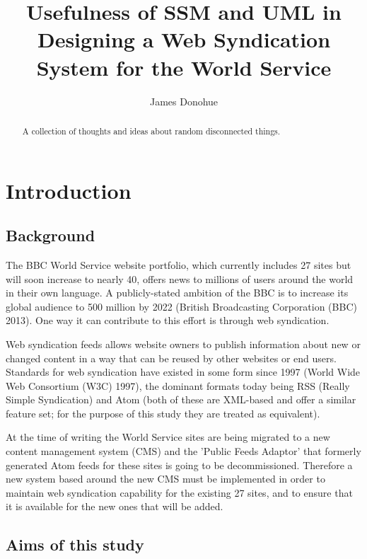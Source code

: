 \documentclass{article}
\begin{document}
\title{Usefulness of SSM and UML in Designing a Web Syndication System for the World Service}
\author{James Donohue}

\maketitle

\begin{abstract}
A collection of thoughts and ideas about random disconnected things.
\end{abstract}

\section{Introduction}
\subsection{Background}

The BBC World Service website portfolio, which currently includes 27 sites but will soon increase to nearly 40, offers news to millions of users around the world in their own language. A publicly-stated ambition of the BBC is to increase its global audience to 500 million by 2022 (British Broadcasting Corporation (BBC) 2013). One way it can contribute to this effort is through web syndication.

Web syndication feeds allows website owners to publish information about new or changed content in a way that can be reused by other websites or end users. Standards for web syndication have existed in some form since 1997 (World Wide Web Consortium (W3C) 1997), the dominant formats today being RSS (Really Simple Syndication) and Atom (both of these are XML-based and offer a similar feature set; for the purpose of this study they are treated as equivalent).

At the time of writing the World Service sites are being migrated to a new content management system (CMS) and the 'Public Feeds Adaptor' that formerly generated Atom feeds for these sites is going to be decommissioned. Therefore a new system based around the new CMS must be implemented in order to maintain web syndication capability for the existing 27 sites, and to ensure that it is available for the new ones that will be added.

\subsection{Aims of this study}
\end{document}
